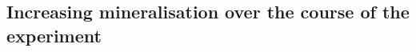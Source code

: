 \documentclass[
]{article}
\begin{document}
\hypertarget{increasing-mineralisation-over-the-course-of-the-experiment}{%
\subsection{Increasing mineralisation over the course of the
experiment}\label{increasing-mineralisation-over-the-course-of-the-experiment}}

\begin{figure}

\begin{minipage}[t]{0.50\linewidth}

{\centering 


}

\end{minipage}%
%
\begin{minipage}[t]{0.50\linewidth}

{\centering 

}
\end{minipage}
\end{figure}
\end{document}
